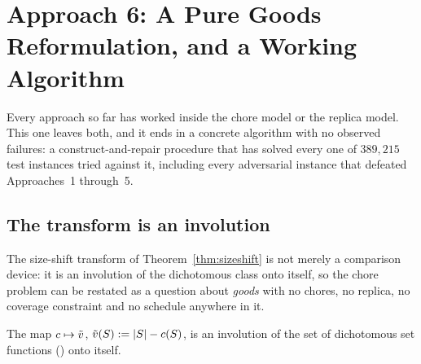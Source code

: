 \section{Approach 6: A Pure Goods Reformulation, and a Working Algorithm}
\label{sec:approach6}

Every approach so far has worked inside the chore model or the replica model.
This one leaves both, and it ends in a concrete algorithm with no observed
failures: a construct-and-repair procedure that has solved every one of
$389{,}215$ test instances tried against it, including every adversarial
instance that defeated Approaches~1 through~5.

\subsection{The transform is an involution}

The size-shift transform of Theorem~\ref{thm:sizeshift} is not merely a
comparison device: it is an involution of the dichotomous class onto itself, so
the chore problem can be restated as a question about \emph{goods} with no
chores, no replica, no coverage constraint and no schedule anywhere in it.

\begin{lemma}
\label{lem:sizeshift-bijection}
The map $c \mapsto \tilde{v}$, $\tilde{v}(S) := \left\lvert S\right\rvert - c(S)$, is an
involution of the set of dichotomous set functions () onto
itself.
\end{lemma}

